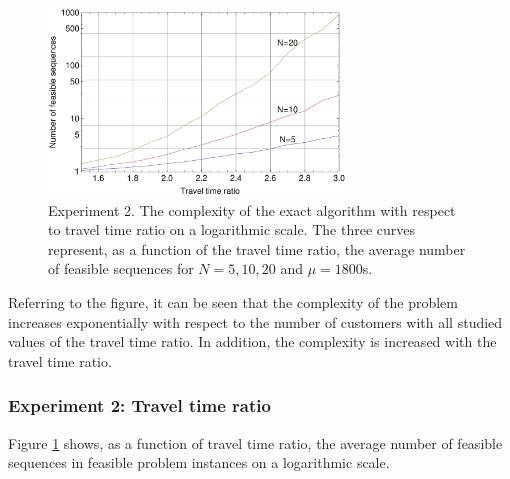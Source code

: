\documentclass[dissertation,draft*]{aaltoseries}
\begin{document}
\begin{figure}
\centering
\includegraphics[width=0.7\textwidth]{ttivertailu01.pdf}
\caption{Experiment 2. The complexity of the exact algorithm with respect to travel time ratio on a logarithmic scale. 
The three curves represent, as a function of the travel time ratio, the average number of feasible sequences
for $N=5,10,20$ and $\mu = 1800$s.}
\label{ttivertailu01}
\end{figure}





Referring to the figure, it can be seen that the complexity of the problem increases exponentially
with respect to the number of customers with all studied values of the travel time ratio.  
In addition, the complexity is increased with the travel time ratio. 



\subsubsection{Experiment 2: Travel time ratio}
Figure \ref{ttivertailu01} shows, as a function of travel time ratio, the average number of feasible sequences in feasible problem instances 
on a logarithmic scale.

\end{document}
